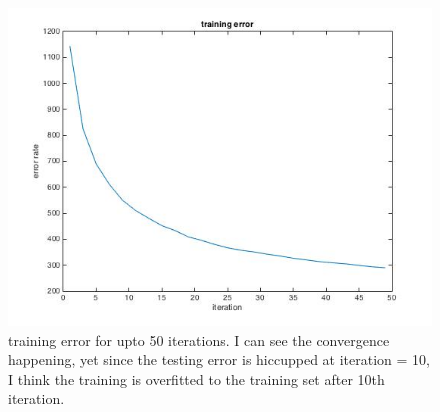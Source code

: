 \documentclass[twoside]{article}
\theoremstyle{definition}
\theoremstyle{definition}
\theoremstyle{remark}
\begin{document}
\begin{figure}[H]
\centering
\includegraphics[width=120mm]{problem2_2.jpg}
\caption{training error for upto 50 iterations. I can see the convergence happening, yet since the testing error is hiccupped at iteration = 10, I think the training is overfitted to the training set after 10th iteration. }
\end{figure}
\end{document}
